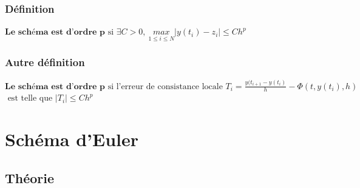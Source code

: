 \documentclass[a4paper,10pt]{report}
\begin{document}
\subsubsection{Définition}
$\textbf{Le schéma est d'ordre p} \text{ si } \exists C > 0, \ \underset{1\leq i \leq N}{max} |y(t_i)-z_i| \leq Ch^p $

\subsubsection{Autre définition}
$\textbf{Le schéma est d'ordre p} \text{ si l'erreur de consistance locale } T_i = \frac{y(t_{i+1}-y(t_i)}{h}- \Phi(t,y(t_i),h)$\\
$\text{ est telle que } |T_i|\leq Ch^p$

\newpage
\section{Schéma d'Euler}
\subsection{Théorie}
\end{document}
